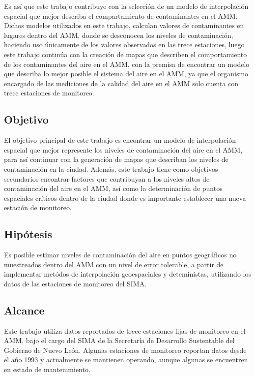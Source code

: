 Es así que este trabajo contribuye con la selección de un modelo de interpolación espacial que mejor describa el compartamiento de contaminantes en el AMM. Dichos modelos utilizados en este trabajo, calculan valores de contaminantes en lugares dentro del AMM, donde se desconocen los niveles de contaminación, haciendo uso únicamente de los valores observados en las trece estaciones, luego este trabajo continúa con la creación de mapas que describen el comportamiento de los contaminantes del aire en el AMM, con la premisa de encontrar un modelo que describa lo mejor posible el sistema del aire en el AMM, ya que el organismo encargado de las mediciones de la calidad del aire en el AMM solo cuenta con trece estaciones de monitoreo.
 
 
\subsection{Objetivo}

El objetivo principal de este trabajo es encontrar un modelo de interpolación espacial que mejor represente los niveles de contaminación del aire en el AMM, para así continuar con la generación de mapas que describan los niveles de contaminación en la ciudad. Además, este trabajo tiene como objetivos secundarios encontrar factores que contribuyan a los niveles altos de contaminación del aire en el AMM, así como la determinación de puntos espaciales críticos dentro de la ciudad donde es importante establecer una nueva estación de monitoreo.



\subsection{Hipótesis}

Es posible estimar niveles de contaminación del aire en puntos geográficos no muestreados dentro del AMM con un nivel de error tolerable, a partir de implementar metódos de interpolación geoespaciales y deteministas, utilizando los datos de las estaciones de monitoreo del SIMA.

\subsection{Alcance}

Este trabajo utiliza datos reportados de trece estaciones fijas de monitoreo en el AMM, bajo el cargo del SIMA de la Secretaría de Desarrollo Sustentable del Gobierno de Nuevo León. Algunas estaciones de monitoreo reportan datos desde el año 1993 y actualmente se mantienen operando, aunque algunas se encuentren en estado de mantenimiento.


